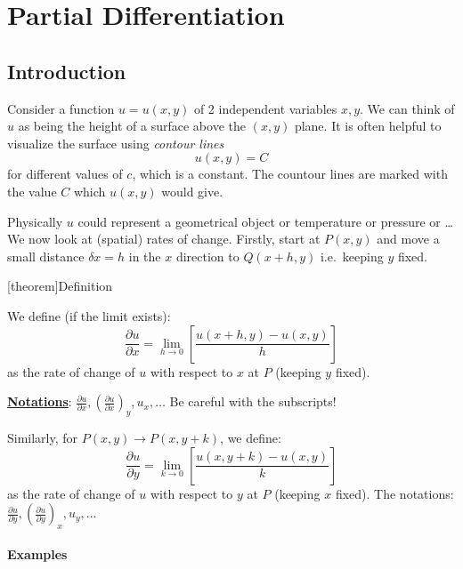 \documentclass[12pt]{report}
\theoremstyle{definition}
\begin{document}
\section{Partial Differentiation}

\subsection{Introduction}

Consider a function $u = u(x,y)$ of 2 independent variables $x, y$.
We can think of $u$ as being the height of a surface above the $(x,y)$ plane.
It is often helpful to visualize the surface using \emph{contour lines}\[
    u(x,y) = C
\]for different values of $c$, which is a constant.
The countour lines are marked with the value $C$ which $u(x,y)$ would give.

Physically $u$ could represent a geometrical object or temperature or pressure or \ldots
We now look at (spatial) rates of change.
Firstly, start at $P(x,y)$ and move a small distance $\delta x = h$ in the $x$ direction
to $Q(x+h,y)$ i.e.\ keeping $y$ fixed. 

[theorem]{Definition}
\begin{partial differentiation}
We define (if the limit exists):\[
    \frac{\partial u}{\partial x} = \lim_{h\rightarrow{}0}
    \left[\frac{u(x+h, y) - u(x,y)}{h}\right] 
\]as the rate of change of $u$ with respect to $x$ at $P$ (keeping $y$ fixed).
\end{partial differentiation}
\textbf{\underline{Notations}}: $\frac{\partial u}{\partial x} , 
{\left(\frac{\partial u}{\partial x} \right)}_y,
u_x,\ldots$
Be careful with the subscripts!

\medskip
Similarly, for $P(x,y) \rightarrow{}P(x, y+k)$, we define:\[
    \frac{\partial u}{\partial y} = \lim_{k\rightarrow{}0}\left[
    \frac{u(x,y+k) - u(x,y)}{k}\right] 
\]as the rate of change of $u$ with respect to $y$ at $P$ (keeping $x$ fixed).
The notations: $\frac{\partial u}{\partial y} , 
{\left(\frac{\partial u}{\partial y} \right)}_x,
u_y,\ldots$

\paragraph{Examples}
\,
\end{document}
